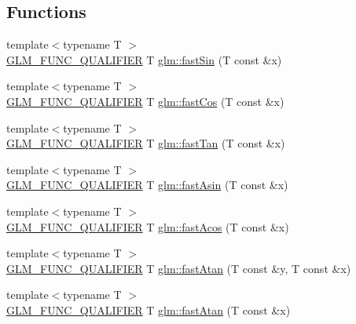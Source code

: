 \subsection*{Functions}
\begin{DoxyCompactItemize}
\item 
{\footnotesize template$<$typename T $>$ }\\\hyperlink{setup_8hpp_a33fdea6f91c5f834105f7415e2a64407}{G\+L\+M\+\_\+\+F\+U\+N\+C\+\_\+\+Q\+U\+A\+L\+I\+F\+I\+ER} T \hyperlink{group__gtx__fast__trigonometry_ga01b7dc431bf5f5e6acce7d6bba311f86}{glm\+::fast\+Sin} (T const \&x)
\item 
{\footnotesize template$<$typename T $>$ }\\\hyperlink{setup_8hpp_a33fdea6f91c5f834105f7415e2a64407}{G\+L\+M\+\_\+\+F\+U\+N\+C\+\_\+\+Q\+U\+A\+L\+I\+F\+I\+ER} T \hyperlink{group__gtx__fast__trigonometry_gad54184beaba79e41db71a1f5711380c4}{glm\+::fast\+Cos} (T const \&x)
\item 
{\footnotesize template$<$typename T $>$ }\\\hyperlink{setup_8hpp_a33fdea6f91c5f834105f7415e2a64407}{G\+L\+M\+\_\+\+F\+U\+N\+C\+\_\+\+Q\+U\+A\+L\+I\+F\+I\+ER} T \hyperlink{group__gtx__fast__trigonometry_gae6615cdb40d8dc58115a07a21f495561}{glm\+::fast\+Tan} (T const \&x)
\item 
{\footnotesize template$<$typename T $>$ }\\\hyperlink{setup_8hpp_a33fdea6f91c5f834105f7415e2a64407}{G\+L\+M\+\_\+\+F\+U\+N\+C\+\_\+\+Q\+U\+A\+L\+I\+F\+I\+ER} T \hyperlink{group__gtx__fast__trigonometry_gab8595a77c5b215b95f662238dc3ff722}{glm\+::fast\+Asin} (T const \&x)
\item 
{\footnotesize template$<$typename T $>$ }\\\hyperlink{setup_8hpp_a33fdea6f91c5f834105f7415e2a64407}{G\+L\+M\+\_\+\+F\+U\+N\+C\+\_\+\+Q\+U\+A\+L\+I\+F\+I\+ER} T \hyperlink{group__gtx__fast__trigonometry_ga44e6efc3e776a51645fdf998e3e4f11b}{glm\+::fast\+Acos} (T const \&x)
\item 
{\footnotesize template$<$typename T $>$ }\\\hyperlink{setup_8hpp_a33fdea6f91c5f834105f7415e2a64407}{G\+L\+M\+\_\+\+F\+U\+N\+C\+\_\+\+Q\+U\+A\+L\+I\+F\+I\+ER} T \hyperlink{group__gtx__fast__trigonometry_gaf6234384b94846e29cf2c51dc245d484}{glm\+::fast\+Atan} (T const \&y, T const \&x)
\item 
{\footnotesize template$<$typename T $>$ }\\\hyperlink{setup_8hpp_a33fdea6f91c5f834105f7415e2a64407}{G\+L\+M\+\_\+\+F\+U\+N\+C\+\_\+\+Q\+U\+A\+L\+I\+F\+I\+ER} T \hyperlink{group__gtx__fast__trigonometry_ga49b3b2b777b83eeed3e11205e800027e}{glm\+::fast\+Atan} (T const \&x)
\end{DoxyCompactItemize}
